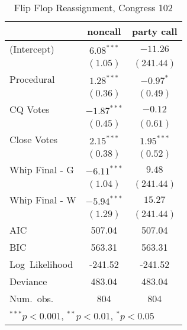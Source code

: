 \documentclass[12pt]{article}
\begin{document}
\begin{table}
	\begin{center}
		\begin{tabular}{l c c }
			\hline
			& noncall & party call \\
			\hline
			(Intercept)      & $6.08^{***}$  & $-11.26$     \\
			& $(1.05)$      & $(241.44)$   \\
			Procedural       & $1.28^{***}$  & $-0.97^{*}$  \\
			& $(0.36)$      & $(0.49)$     \\
			CQ Votes    & $-1.87^{***}$ & $-0.12$      \\
			& $(0.45)$      & $(0.61)$     \\
			Close Votes & $2.15^{***}$  & $1.95^{***}$ \\
			& $(0.38)$      & $(0.52)$     \\
			Whip Final - G     & $-6.11^{***}$ & $9.48$       \\
			& $(1.04)$      & $(241.44)$   \\
			Whip Final - W     & $-5.94^{***}$ & $15.27$      \\
			& $(1.29)$      & $(241.44)$   \\
			\hline
			AIC              & 507.04        & 507.04       \\
			BIC              & 563.31        & 563.31       \\
			Log\ Likelihood  & -241.52       & -241.52      \\
			Deviance         & 483.04        & 483.04       \\
			Num.\ obs.       & 804           & 804          \\
			\hline
			\multicolumn{3}{l}{\scriptsize{$^{***}p<0.001$, $^{**}p<0.01$, $^*p<0.05$}}
		\end{tabular}
		\caption{Flip Flop Reassignment, Congress 102}
		\label{table:coefficients}
	\end{center}
\end{table}
\end{document}
